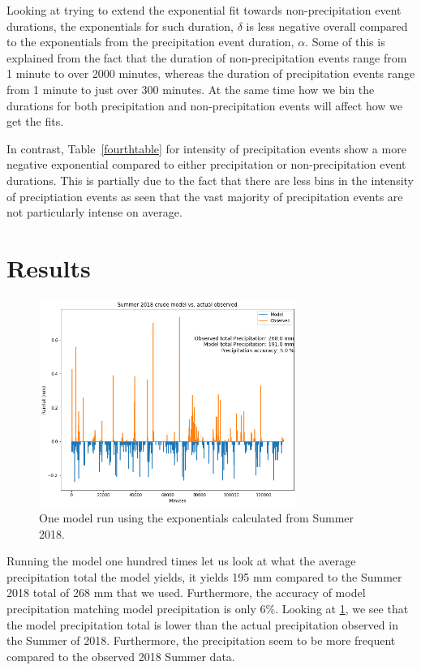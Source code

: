 \documentclass[11pt]{report}
\begin{document}
Looking at trying to extend the exponential fit towards non-precipitation event durations, the exponentials for such duration, $\delta$ is less negative overall compared to the exponentials from the precipitation event duration, $\alpha$. Some of this is explained from the fact that the duration of non-precipitation events range from 1 minute to over 2000 minutes, whereas the duration of precipitation events range from 1 minute to just over 300 minutes. At the same time how we bin the durations for both precipitation and non-precipitation events will affect how we get the fits. 











In contrast, Table~\ref{fourthtable} for intensity of precipitation events show a more negative exponential compared to either precipitation or non-precipitation event durations. This is partially due to the fact that there are less bins in the intensity of preciptiation events as seen that the vast majority of precipitation events are not particularly intense on average. 



\clearpage
\section{Results\label{sec:results}}
\begin{figure}[t]
	\centering
	\includegraphics[width=0.75\textwidth]{Figures/better_one_run.png}
	\caption[One run using Summer 2018 climatology]
	{\label{crudemodel}One model run using the exponentials calculated from Summer 2018.  }
\end{figure}
Running the model one hundred times let us look at what the average precipitation total the model yields, it yields 195 mm compared to the Summer 2018 total of 268 mm that we used. Furthermore, the accuracy of model precipitation matching model precipitation is only 6$\%$. Looking at \ref{crudemodel}, we see that the model precipitation total is lower than the actual precipitation observed in the Summer of 2018. Furthermore, the precipitation seem to be more frequent compared to the observed 2018 Summer data. 
\end{document}
